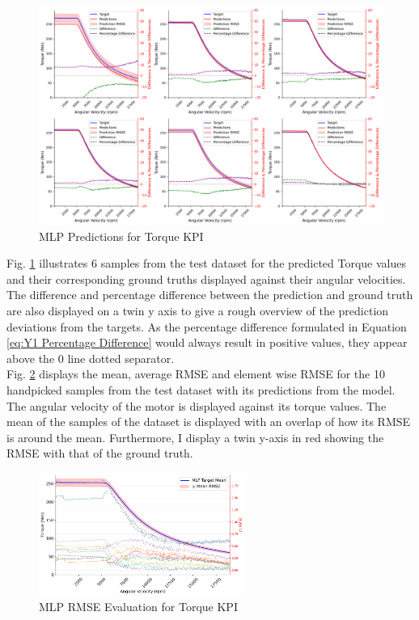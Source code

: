 \documentclass{report} %
\begin{document}
\begin{figure}[H]
    \centering
    \includegraphics[width=.9\textwidth]{./ReportImages/KPI2D_predictions.png} 
    \caption{MLP Predictions for Torque \ac{KPI}} 
    \label{fig:MLP Training Results for 2D KPI(Torque)}
\end{figure}

Fig. \ref{fig:MLP Training Results for 2D KPI(Torque)} illustrates 6 samples from the test dataset for the predicted Torque values and their corresponding ground truths 
displayed against their angular velocities. The difference and percentage difference between the prediction and ground truth are also displayed on a twin y axis to 
give a rough overview of the prediction deviations from the targets. As the percentage difference formulated in Equation \ref{eq:Y1 Percentage Difference} would 
always result in positive values, they appear above the 0 line dotted separator.\\

Fig. \ref{fig:MLP RMSE Evaluation for 2D KPI(Torque)} displays the mean, average \ac{RMSE} and element wise \ac{RMSE} for the 10 handpicked samples from the test dataset 
with its predictions from the model. 
The angular velocity of the motor is displayed against its torque values.
The mean of the samples of the dataset is displayed with an overlap of how its \ac{RMSE} is around the mean.
Furthermore, I display a twin y-axis in red showing the \ac{RMSE} with that of the ground truth.

\begin{figure}[H]
    \centering
    \includegraphics[width=0.6\textwidth]{./ReportImages/RMSE_MLP_y1.png} 
    \caption{\ac{MLP} \ac{RMSE} Evaluation for Torque \ac{KPI}} 
    \label{fig:MLP RMSE Evaluation for 2D KPI(Torque)}
\end{figure}
\end{document}
